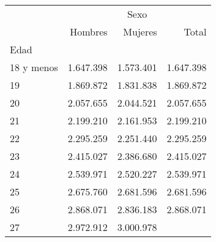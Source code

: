 \begin{tabular}{llll}
\cline{1-4}
\multicolumn{1}{c}{} &
  \multicolumn{3}{|c}{Sexo} \\
\multicolumn{1}{c}{} &
  \multicolumn{1}{|r}{Hombres} &
  \multicolumn{1}{r}{Mujeres} &
  \multicolumn{1}{r}{Total} \\
\cline{1-4}
\multicolumn{1}{l}{Edad} &
  \multicolumn{1}{|r}{} &
  \multicolumn{1}{r}{} &
  \multicolumn{1}{r}{} \\
\multicolumn{1}{l}{\hspace{1em}18 y menos} &
  \multicolumn{1}{|r}{1.647.398} &
  \multicolumn{1}{r}{1.573.401} &
  \multicolumn{1}{r}{1.647.398} \\
\multicolumn{1}{l}{\hspace{1em}19} &
  \multicolumn{1}{|r}{1.869.872} &
  \multicolumn{1}{r}{1.831.838} &
  \multicolumn{1}{r}{1.869.872} \\
\multicolumn{1}{l}{\hspace{1em}20} &
  \multicolumn{1}{|r}{2.057.655} &
  \multicolumn{1}{r}{2.044.521} &
  \multicolumn{1}{r}{2.057.655} \\
\multicolumn{1}{l}{\hspace{1em}21} &
  \multicolumn{1}{|r}{2.199.210} &
  \multicolumn{1}{r}{2.161.953} &
  \multicolumn{1}{r}{2.199.210} \\
\multicolumn{1}{l}{\hspace{1em}22} &
  \multicolumn{1}{|r}{2.295.259} &
  \multicolumn{1}{r}{2.251.440} &
  \multicolumn{1}{r}{2.295.259} \\
\multicolumn{1}{l}{\hspace{1em}23} &
  \multicolumn{1}{|r}{2.415.027} &
  \multicolumn{1}{r}{2.386.680} &
  \multicolumn{1}{r}{2.415.027} \\
\multicolumn{1}{l}{\hspace{1em}24} &
  \multicolumn{1}{|r}{2.539.971} &
  \multicolumn{1}{r}{2.520.227} &
  \multicolumn{1}{r}{2.539.971} \\
\multicolumn{1}{l}{\hspace{1em}25} &
  \multicolumn{1}{|r}{2.675.760} &
  \multicolumn{1}{r}{2.681.596} &
  \multicolumn{1}{r}{2.681.596} \\
\multicolumn{1}{l}{\hspace{1em}26} &
  \multicolumn{1}{|r}{2.868.071} &
  \multicolumn{1}{r}{2.836.183} &
  \multicolumn{1}{r}{2.868.071} \\
\multicolumn{1}{l}{\hspace{1em}27} &
  \multicolumn{1}{|r}{2.972.912} &
  \multicolumn{1}{r}{3.000.978} &

\end{tabular}
